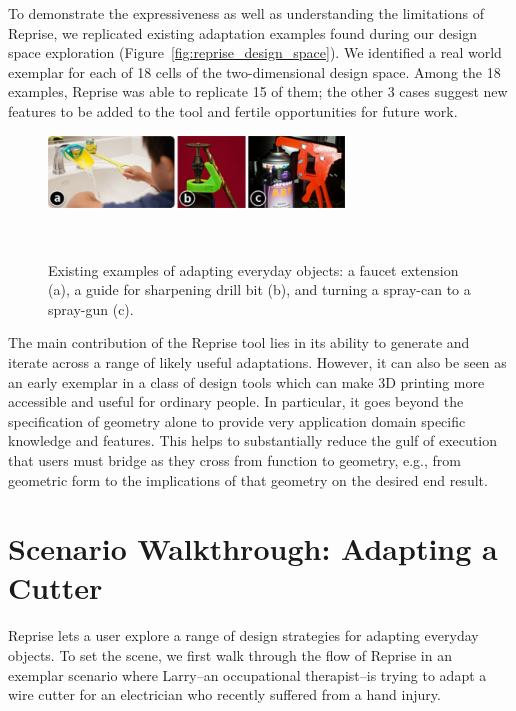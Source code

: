 To demonstrate the expressiveness as well as understanding the limitations of Reprise, we replicated existing adaptation examples found during our design space exploration (Figure~\ref{fig:reprise_design_space}). We identified a real world exemplar for each of 18 cells of the two-dimensional design space. Among the 18 examples, Reprise was able to replicate 15 of them; the other 3 cases suggest new features to be added to the tool and  fertile opportunities for future work.

\begin{figure}[!h]
  \centering
  \includegraphics[width=0.7\textwidth]{figures/reprise_existing_adaptations.pdf}
  \caption{Existing examples of adapting everyday objects: a faucet extension (a), a guide for sharpening drill bit (b), and turning a spray-can to a spray-gun (c).}~\label{fig:reprise_existing_adaptations}
\end{figure}

The main contribution of the Reprise tool lies in its ability to generate and iterate across a range of likely useful adaptations. However, it can also be seen as an early exemplar in a class of design tools which can make 3D printing more accessible and useful for ordinary people. In particular, it goes beyond the specification of geometry alone to provide very application domain specific knowledge and features.  This helps to substantially reduce the gulf of execution \cite{norman2013design} that users must bridge as they cross from function to geometry, e.g., from geometric form to the implications of that geometry on the desired end result.

\section{Scenario Walkthrough: Adapting a Cutter}
Reprise lets a user explore a range of design strategies for adapting everyday objects. To set the scene, we first walk through the flow of Reprise in an exemplar scenario where Larry--an occupational therapist--is trying to adapt a wire cutter for an electrician who recently suffered from a hand injury.

